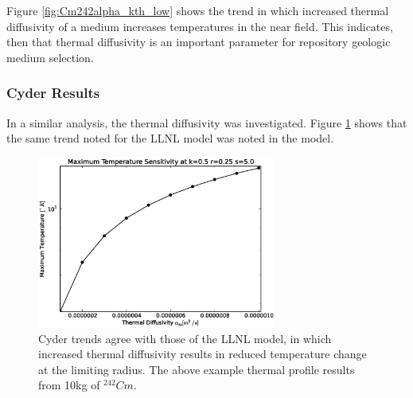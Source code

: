 Figure \ref{fig:Cm242alpha_kth_low} shows the trend in which increased thermal 
diffusivity of a medium increases temperatures in the near field. This 
indicates, then that thermal diffusivity is an important parameter for 
repository geologic medium selection.

%


\FloatBarrier
\subsubsection{Cyder Results}

In a similar analysis, the thermal diffusivity was investigated. Figure 
\ref{fig:diffusivity_cyder} shows that the same trend noted for the LLNL model was noted in the 
\Cyder model.

\begin{figure}[htbp!]
    \begin{center}
      \includegraphics[width=0.7\textwidth]{./chapters/demonstration/diffusivity/diffusivity_cyder.eps}
      \caption[$\alpha_{th}$ Sensitivity in Cyder]{Cyder trends agree with those 
        of the LLNL model, in which increased thermal diffusivity results in 
        reduced temperature change at the limiting radius. The above example 
        thermal profile results from 10kg of $^{242}Cm$.} 
        \label{fig:diffusivity_cyder}
      \end{center}
    \end{figure}

